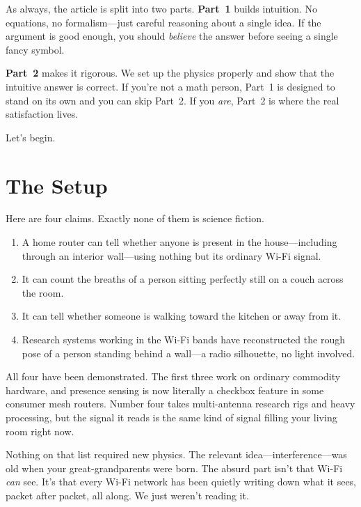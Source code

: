 \documentclass[11pt, letterpaper]{article}
\begin{document}
As always, the article is split into two parts. \textbf{Part~1} builds intuition. No equations, no formalism---just careful reasoning about a single idea. If the argument is good enough, you should \textit{believe} the answer before seeing a single fancy symbol.

\textbf{Part~2} makes it rigorous. We set up the physics properly and show that the intuitive answer is correct. If you're not a math person, Part~1 is designed to stand on its own and you can skip Part~2. If you \textit{are}, Part~2 is where the real satisfaction lives.

Let's begin.



\section*{The Setup}

Here are four claims. Exactly none of them is science fiction.

\begin{enumerate}[nosep]
  \item A home router can tell whether anyone is present in the house---including through an interior wall---using nothing but its ordinary Wi-Fi signal.
  \item It can count the breaths of a person sitting perfectly still on a couch across the room.
  \item It can tell whether someone is walking toward the kitchen or away from it.
  \item Research systems working in the Wi-Fi bands have reconstructed the rough pose of a person standing behind a wall---a radio silhouette, no light involved.
\end{enumerate}

All four have been demonstrated. The first three work on ordinary commodity hardware, and presence sensing is now literally a checkbox feature in some consumer mesh routers. Number four takes multi-antenna research rigs and heavy processing, but the signal it reads is the same kind of signal filling your living room right now.

Nothing on that list required new physics. The relevant idea---interference---was old when your great-grandparents were born. The absurd part isn't that Wi-Fi \textit{can} see. It's that every Wi-Fi network has been quietly writing down what it sees, packet after packet, all along. We just weren't reading it.
\end{document}

